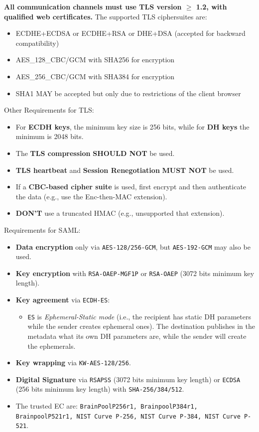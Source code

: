 \textbf{All communication channels must use TLS version $\geq$ 1.2,
with qualified web certificates.} The supported TLS ciphersuites are:
\begin{itemize}
    \item ECDHE+ECDSA or ECDHE+RSA or DHE+DSA (accepted for backward
      compatibility)
    \item AES\_128\_CBC/GCM with SHA256 for encryption
    \item AES\_256\_CBC/GCM with SHA384 for encryption
    \item SHA1 MAY be accepted but only due to restrictions of the
      client browser
\end{itemize}

Other Requirements for TLS:

\begin{itemize}
    \item For \textbf{ECDH keys}, the minimum key size is 256 bits,
      while for \textbf{DH keys} the minimum is 2048 bits.
    \item The \textbf{TLS compression} \textbf{SHOULD NOT} be used.
    \item \textbf{TLS heartbeat} and \textbf{Session Renegotiation}
      \textbf{MUST NOT} be used.
    \item If a \textbf{CBC-based cipher suite} is used, first encrypt
      and then authenticate the data (e.g., use the Enc-then-MAC
      extension).
    \item \textbf{DON'T} use a truncated HMAC (e.g., unsupported that
      extension).
\end{itemize}

Requirements for SAML:

\begin{itemize}
    \item \textbf{Data encryption} only via \texttt{AES-128/256-GCM},
      but \texttt{AES-192-GCM} may also be used.
    \item \textbf{Key encryption} with \texttt{RSA-OAEP-MGF1P} or
      \texttt{RSA-OAEP} (3072 bits minimum key length).
    \item \textbf{Key agreement} via \texttt{ECDH-ES}:
    \begin{itemize}
        \item \texttt{ES} is \textit{Ephemeral-Static mode} (i.e., the
          recipient has static DH parameters while the sender creates
          ephemeral ones). The destination publishes in the metadata
          what its own DH parameters are, while the sender will create
          the ephemerals.
    \end{itemize}
    \item \textbf{Key wrapping} via \texttt{KW-AES-128/256}.
    \item \textbf{Digital Signature} via \texttt{RSAPSS} (3072 bits
      minimum key length) or \texttt{ECDSA} (256 bits minimum key
      length) with \texttt{SHA-256/384/512}.
    \item The trusted EC are: \texttt{BrainPoolP256r1,
      BrainpoolP384r1, BrainpoolP521r1, NIST Curve P-256, NIST Curve
    P-384, NIST Curve P-521}.
\end{itemize}

